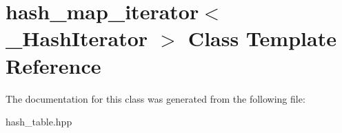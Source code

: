 \section{hash\+\_\+map\+\_\+iterator$<$ \+\_\+\+Hash\+Iterator $>$ Class Template Reference}
\label{classhash__map__iterator}


The documentation for this class was generated from the following file\+:\begin{DoxyCompactItemize}
\item 
hash\+\_\+table.\+hpp\end{DoxyCompactItemize}
